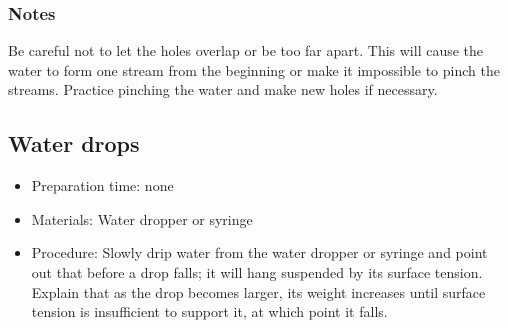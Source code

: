 \subsubsection*{Notes}
Be careful not to let the holes overlap or be too far apart. This will cause the water to form one stream from the beginning or make it impossible to pinch the streams. Practice pinching the water and make new holes if necessary.




\subsection{Water drops}
\begin{itemize}
\item{Preparation time: none}
\item{Materials: Water dropper or syringe}
\item{Procedure: Slowly drip water from the water dropper or syringe and point out that before a drop falls; it will hang suspended by its surface tension. Explain that as the drop becomes larger, its weight increases until surface tension is insufficient to support it, at which point it falls.}
\end{itemize}

